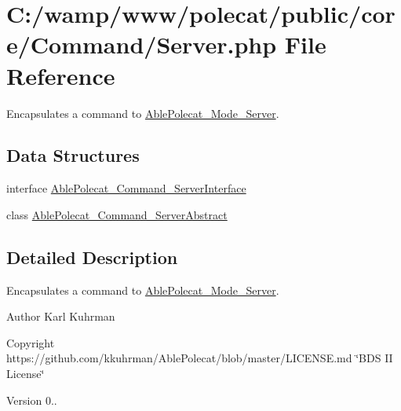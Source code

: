 \hypertarget{_command_2_server_8php}{}\section{C\+:/wamp/www/polecat/public/core/\+Command/\+Server.php File Reference}
\label{_command_2_server_8php}


Encapsulates a command to \hyperlink{class_able_polecat___mode___server}{Able\+Polecat\+\_\+\+Mode\+\_\+\+Server}.  


\subsection*{Data Structures}
\begin{DoxyCompactItemize}
\item 
interface \hyperlink{interface_able_polecat___command___server_interface}{Able\+Polecat\+\_\+\+Command\+\_\+\+Server\+Interface}
\item 
class \hyperlink{class_able_polecat___command___server_abstract}{Able\+Polecat\+\_\+\+Command\+\_\+\+Server\+Abstract}
\end{DoxyCompactItemize}


\subsection{Detailed Description}
Encapsulates a command to \hyperlink{class_able_polecat___mode___server}{Able\+Polecat\+\_\+\+Mode\+\_\+\+Server}. 

\begin{DoxyAuthor}{Author}
Karl Kuhrman 
\end{DoxyAuthor}
\begin{DoxyCopyright}{Copyright}
https\+://github.com/kkuhrman/\+Able\+Polecat/blob/master/\+L\+I\+C\+E\+N\+S\+E.\+md \char`\"{}\+B\+D\+S I\+I License\char`\"{} 
\end{DoxyCopyright}
\begin{DoxyVersion}{Version}
0.. 
\end{DoxyVersion}
